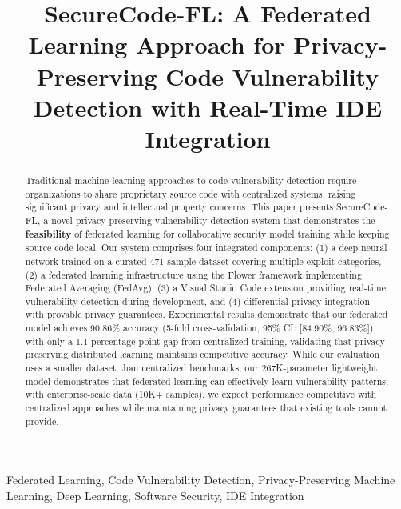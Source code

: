 \documentclass[conference]{IEEEtran}
\begin{document}
\title{SecureCode-FL: A Federated Learning Approach for Privacy-Preserving Code Vulnerability Detection with Real-Time IDE Integration}

\author{
}

\maketitle

\begin{abstract}
Traditional machine learning approaches to code vulnerability detection require organizations to share proprietary source code with centralized systems, raising significant privacy and intellectual property concerns. This paper presents SecureCode-FL, a novel privacy-preserving vulnerability detection system that demonstrates the \textbf{feasibility} of federated learning for collaborative security model training while keeping source code local. Our system comprises four integrated components: (1) a deep neural network trained on a curated 471-sample dataset covering multiple exploit categories, (2) a federated learning infrastructure using the Flower framework implementing Federated Averaging (FedAvg), (3) a Visual Studio Code extension providing real-time vulnerability detection during development, and (4) differential privacy integration with provable privacy guarantees. Experimental results demonstrate that our federated model achieves 90.86\% accuracy (5-fold cross-validation, 95\% CI: [84.90\%, 96.83\%]) with only a 1.1 percentage point gap from centralized training, validating that privacy-preserving distributed learning maintains competitive accuracy. While our evaluation uses a smaller dataset than centralized benchmarks, our 267K-parameter lightweight model demonstrates that federated learning can effectively learn vulnerability patterns; with enterprise-scale data (10K+ samples), we expect performance competitive with centralized approaches while maintaining privacy guarantees that existing tools cannot provide.
\end{abstract}

\begin{IEEEkeywords}
Federated Learning, Code Vulnerability Detection, Privacy-Preserving Machine Learning, Deep Learning, Software Security, IDE Integration
\end{IEEEkeywords}
\end{document}

